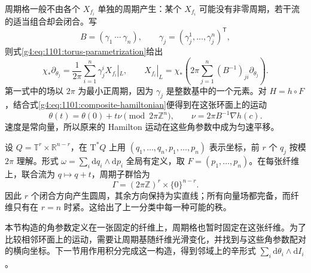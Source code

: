周期格一般不由各个 \(X_{f_i}\) 单独的周期产生：某个 \(X_{f_i}\) 可能没有非零周期，若干流的适当组合却会闭合。写
\[
	B=(\gamma_1\ \cdots\ \gamma_n),
	\qquad
	\gamma_j=(\gamma_j^1,\ldots,\gamma_j^n)^{\mathsf T},
\]
则式\eqref{g4:eq:1101:torus-parametrization}给出
\begin{equation}\label{g4:eq:1101:normalized-fields}
	\chi_*\partial_{\theta_j}
	=\frac1{2\pi}\sum_{i=1}^n\gamma_j^iX_{f_i}|_L,
	\qquad
	X_{f_i}|_L
	=\chi_*\left(2\pi\sum_{j=1}^n
	(B^{-1})_{ji}\partial_{\theta_j}\right).
\end{equation}
第一式中的场以 \(2\pi\) 为最小正周期，因为 \(\gamma_j\) 是整数基中的一个元素。对 \(H=h\circ F\)，结合式\eqref{g4:eq:1101:composite-hamiltonian}便得到在这张环面上的运动
\begin{equation}\label{g4:eq:1101:torus-frequency}
	\theta(t)=\theta(0)+t\nu\pmod{2\pi\mathbb Z^n},
	\qquad \nu=2\pi B^{-1}\nabla h(c).
\end{equation}
速度是常向量，所以原来的 Hamilton 运动在这些角参数中成为匀速平移。

\begin{example}\label{g4:exm:1101:cylinder-periods}
	设 \(Q=\mathbb T^r\times\mathbb R^{n-r}\)，在 \(\mathrm{T}^*Q\) 上用 \((q_1,\ldots,q_n,p_1,\ldots,p_n)\) 表示坐标，前 \(r\) 个 \(q_j\) 按模 \(2\pi\) 理解。形式 \(\omega=\sum_i\mathrm{d}q_i\wedge\mathrm{d}p_i\) 全局有定义，取 \(F=(p_1,\ldots,p_n)\)。在每张纤维上，联合流为 \(q\mapsto q+t\)，周期子群恰为
	\[
		\Gamma=(2\pi\mathbb Z)^r\times\{0\}^{n-r}.
	\]
	因此 \(r\) 个闭合方向产生圆周，其余方向保持为实直线；所有向量场都完备，而纤维只有在 \(r=n\) 时紧。这给出了上一分类中每一种可能的秩。
\end{example}

本节构造的角参数定义在一张固定的纤维上，周期格也暂时固定在这张纤维。为了比较相邻环面上的运动，需要让周期基随纤维光滑变化，并找到与这些角参数配对的横向坐标。下一节用作用积分完成这一构造，得到邻域上的辛形式 \(\sum_i\mathrm{d}\theta_i\wedge\mathrm{d}I_i\)。
